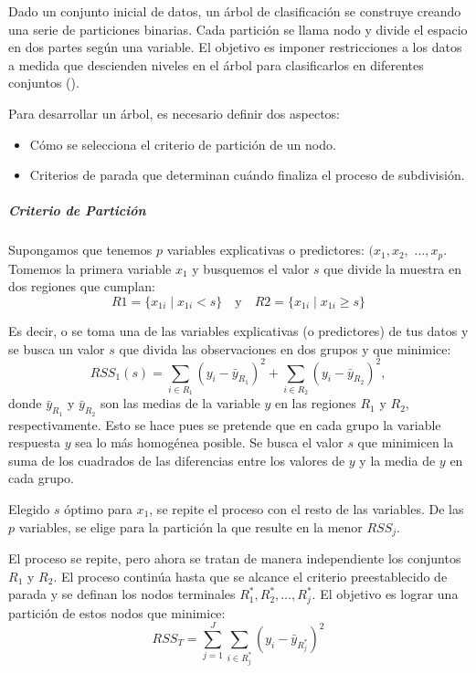 Dado un conjunto inicial de datos, un árbol de clasificación se construye creando una serie de particiones binarias. Cada partición se llama nodo y divide el espacio en dos partes según una variable. El objetivo es imponer restricciones a los datos a medida que descienden niveles en el árbol para clasificarlos en diferentes conjuntos (\cite{wu2008top}).

Para desarrollar un árbol, es necesario definir dos aspectos:
\begin{itemize}
	\item Cómo se selecciona el criterio de partición de un nodo.
	\item Criterios de parada que determinan cuándo finaliza el proceso de subdivisión.
\end{itemize}


\subparagraph{Criterio de Partición}
Supongamos que tenemos \(p\) variables explicativas o predictores: $(x_1, x_2,$ $\ldots, x_p$. Tomemos la primera variable \(x_1\) y busquemos el valor \(s\) que divide la muestra en dos regiones que cumplan:
\[
R1 = \{x_{1i} \mid x_{1i} < s\} \quad \text{y} \quad R2 = \{x_{1i} \mid x_{1i} \geq s\}
\]

Es decir, o se toma una de las variables explicativas (o predictores) de tus datos y se busca un valor $s$ que divida las observaciones en dos grupos y que minimice:
\[
RSS_1(s) = \sum_{i \in R_1} (y_i - \bar{y}_{R_1})^2 + \sum_{i \in R_2} (y_i - \bar{y}_{R_2})^2,
\]
donde \(\bar{y}_{R_1}\) y \(\bar{y}_{R_2}\) son las medias de la variable \(y\) en las regiones \(R_1\) y \(R_2\), respectivamente. Esto se hace pues se pretende que en cada grupo la variable respuesta \(y\) sea lo más homogénea posible. Se busca el valor $s$ que minimicen la suma de los cuadrados de las diferencias entre los valores de $y$ y la media de $y$ en cada grupo.

Elegido \(s\) óptimo para \(x_1\), se repite el proceso con el resto de las variables. De las \(p\) variables, se elige para la partición la que resulte en la menor \(RSS_j\).

El proceso se repite, pero ahora se tratan de manera independiente los conjuntos \(R_1\) y \(R_2\). El proceso continúa hasta que se alcance el criterio preestablecido de parada y se definan los nodos terminales \(R_1^*, R_2^*, \ldots, R_j^*\). El objetivo es lograr una partición de estos nodos que minimice:
\[
RSS_T = \sum_{j=1}^{J} \sum_{i \in R_j^*} (y_i - \bar{y}_{R_j^*})^2
\]

